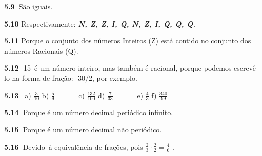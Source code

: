 \documentclass[12pt]{article}
\renewcommand{\_}{\kern-1.5pt\textunderscore\kern-1.5pt}
\begin{document}
\vspace{\baselineskip}
\setlength{\parskip}{8.04pt}
\begin{adjustwidth}{0.3in}{0.0in}
\textbf{5.9\  }São iguais.\par

\end{adjustwidth}

\begin{adjustwidth}{0.3in}{0.0in}
\textbf{5.10 }Respectivamente: \textbf{\textit{N, Z, Z, I, Q, N, Z, I, Q, Q, Q. }}\par

\end{adjustwidth}

\begin{adjustwidth}{0.3in}{0.0in}
\textbf{5.11} Porque o conjunto dos números Inteiros (Z) está contido no conjunto dos números Racionais (Q).\par

\end{adjustwidth}

\begin{adjustwidth}{0.3in}{0.0in}
\textbf{5.12}  -15\ é um número inteiro, mas também é racional, porque podemos escrevê-lo  na forma de fração: -30/2, por exemplo.\par

\end{adjustwidth}

\begin{adjustwidth}{0.3in}{0.0in}
\textbf{5.13} \  a)  \( \frac{3}{10} \) \tab  b)  \( \frac{5}{9} \) \ \ \ \ \ \   c)  \( \frac{132}{100} \) \tab d)  \( \frac{7}{33} \) \ \ \ \ \  \  e)  \( \frac{4}{3} \) \tab \tab f)  \( \frac{340}{99} \) \ \  \par

\end{adjustwidth}

\begin{adjustwidth}{0.3in}{0.0in}
\textbf{5.14\  }Porque é um número decimal periódico infinito.\par

\end{adjustwidth}

\begin{adjustwidth}{0.3in}{0.0in}
\textbf{5.15\  }Porque é um número decimal não periódico.\par

\end{adjustwidth}

\begin{adjustwidth}{0.3in}{0.0in}
\textbf{5.16\  }Devido\ à equivalência de frações, pois   \( \frac{2}{3} \cdot \frac{2}{2}=\frac{4}{6} \) . \par

\end{adjustwidth}
\end{document}
